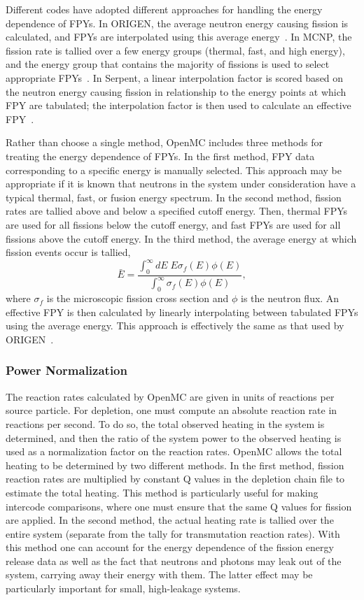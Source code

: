 \documentclass[3p,authoryear]{elsarticle}
\begin{document}
Different codes have adopted different approaches for handling the energy
dependence of FPYs. In ORIGEN, the average neutron energy causing fission is
calculated, and FPYs are interpolated using this average
energy~\citep{gauld2011nt}. In MCNP, the fission rate is tallied over a few
energy groups (thermal, fast, and high energy), and the energy group that
contains the majority of fissions is used to select appropriate
FPYs~\citep{fensin2008nt,fensin2011lanl}. In Serpent, a linear interpolation
factor is scored based on the neutron energy causing fission in relationship to
the energy points at which FPY are tabulated; the interpolation factor is then
used to calculate an effective FPY~\citep{kunchev2019mc}.

Rather than choose a single method, OpenMC includes three methods for treating
the energy dependence of FPYs. In the first method, FPY data corresponding to a
specific energy is manually selected. This approach may be appropriate if it is
known that neutrons in the system under consideration have a typical thermal,
fast, or fusion energy spectrum. In the second method, fission rates are tallied
above and below a specified cutoff energy. Then, thermal FPYs are used for all
fissions below the cutoff energy, and fast FPYs are used for all fissions above
the cutoff energy. In the third method, the average energy at which fission
events occur is tallied,
\begin{equation}
  \bar{E} = \frac{\int_0^\infty dE \; E \sigma_f(E)\phi(E)}{\int_0^\infty \sigma_f(E) \phi(E)},
\end{equation}
where $\sigma_f$ is the microscopic fission cross section and $\phi$ is the
neutron flux. An effective FPY is then calculated by linearly interpolating
between tabulated FPYs using the average energy. This approach is effectively
the same as that used by ORIGEN~\citep{gauld2011nt}.

\subsubsection{Power Normalization}

The reaction rates calculated by OpenMC are given in units of reactions per
source particle. For depletion, one must compute an absolute reaction rate in
reactions per second. To do so, the total observed heating in the system is
determined, and then the ratio of the system power to the observed heating is
used as a normalization factor on the reaction rates. OpenMC allows the total
heating to be determined by two different methods. In the first method, fission
reaction rates are multiplied by constant Q values in the depletion chain file
to estimate the total heating. This method is particularly useful for making
intercode comparisons, where one must ensure that the same Q values for fission
are applied. In the second method, the actual heating rate is tallied over the
entire system (separate from the tally for transmutation reaction rates). With
this method one can account for the energy dependence of the fission energy
release data as well as the fact that neutrons and photons may leak out of the
system, carrying away their energy with them. The latter effect may be
particularly important for small, high-leakage systems.
\end{document}
